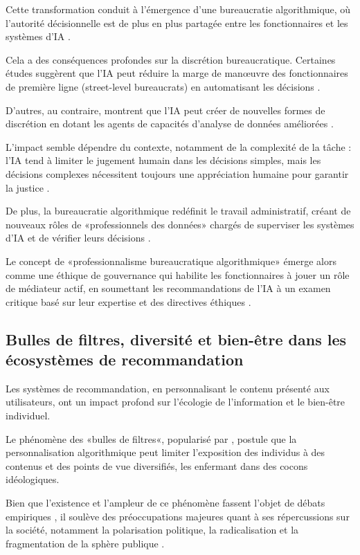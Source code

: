 Cette transformation conduit à l'émergence d'une bureaucratie algorithmique, où l'autorité décisionnelle est de plus en plus partagée entre les fonctionnaires et les systèmes d'IA \citep{Vogl2020, Roehl1999Algorithmic}.

Cela a des conséquences profondes sur la discrétion bureaucratique. Certaines études suggèrent que l'IA peut réduire la marge de manœuvre des fonctionnaires de première ligne (street-level bureaucrats) en automatisant les décisions \citep{Aviram2023Algorithmic, Giest2022}.

D'autres, au contraire, montrent que l'IA peut créer de nouvelles formes de discrétion en dotant les agents de capacités d'analyse de données améliorées \citet{Bullock2019Artificial}. 

L'impact semble dépendre du contexte, notamment de la complexité de la tâche : l'IA tend à limiter le jugement humain dans les décisions simples, mais les décisions complexes nécessitent toujours une appréciation humaine pour garantir la justice \citep{Bullock2022The, Nagtegaal2025The}.

De plus, la bureaucratie algorithmique redéfinit le travail administratif, créant de nouveaux rôles de «professionnels des données» chargés de superviser les systèmes d'IA et de vérifier leurs décisions \citep{Fest2023The}.

Le concept de «professionnalisme bureaucratique algorithmique» émerge alors comme une éthique de gouvernance qui habilite les fonctionnaires à jouer un rôle de médiateur actif, en soumettant les recommandations de l'IA à un examen critique basé sur leur expertise et des directives éthiques \citet{Busuioc2020}.

\subsection{Bulles de filtres, diversité et bien-être dans les écosystèmes de recommandation}
Les systèmes de recommandation, en personnalisant le contenu présenté aux utilisateurs, ont un impact profond sur l'écologie de l'information et le bien-être individuel. 

Le phénomène des «bulles de filtres«, popularisé par \citet{Pariser2011The}, postule que la personnalisation algorithmique peut limiter l'exposition des individus à des contenus et des points de vue diversifiés, les enfermant dans des cocons idéologiques.

Bien que l'existence et l'ampleur de ce phénomène fassent l'objet de débats empiriques \citet{ZuiderveenBorgesius2016}, il soulève des préoccupations majeures quant à ses répercussions sur la société, notamment la polarisation politique, la radicalisation et la fragmentation de la sphère publique \citet{Sunstein2018republic}.

